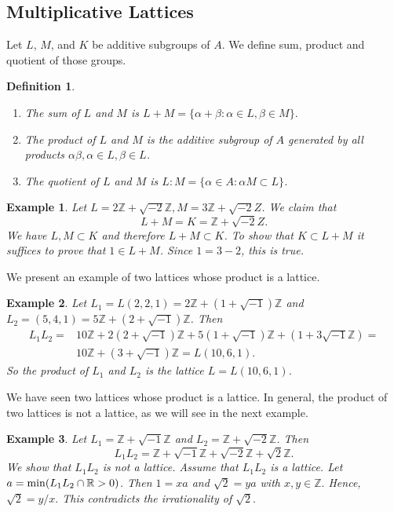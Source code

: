 \documentclass[12pt, letterpaper]{report}
\newtheorem{definition}{Definition}
\newtheorem{example}{Example}
\begin{document}
\subsection{Multiplicative Lattices}
Let $L$, $M$, and $K$ be additive subgroups of $A$. We define sum, product and quotient of those groups.
\noindent
\begin{definition}
\begin{enumerate}
\strut	
\item  The sum of $L$ and $M$ is $L+M = \{\alpha + \beta : \alpha \in L, \beta \in M \}.$
\item  The product of $L$ and $M$ is the additive subgroup of $A$ generated by all
products $\alpha\beta, \alpha \in L, \beta \in L$.
\item The quotient of $L$ and $M$ is $L : M = \{\alpha\in A : \alpha M \subset L \}$.
\end{enumerate}
\end{definition}

\begin{example}
Let $L = 2\mathbb{Z}+\sqrt{−2}\mathbb{Z}, M = 3\mathbb{Z}+ \sqrt{-2}Z$. 
We claim that 
$$
L + M = K = \mathbb{Z} + \sqrt{-2}Z.
$$
We have $L, M \subset K$ and therefore $L + M \subset K$. To show that
$K \subset L + M$ it suffices to prove that $1 \in L + M$. Since $1 = 3 - 2$, this is true.
\end{example}

We present an example of two lattices whose product is a lattice.

\begin{example}
Let $L_{1} = L(2,2,1) = 2\mathbb{Z} + (1+\sqrt{-1})\mathbb{Z}$ and
$L_{2}=(5, 4, 1) = 5\mathbb{Z} + (2 + \sqrt{-1})\mathbb{Z}$. 
Then 
$$
\begin{array}{rl}
L_{1}L_{2}  = & 10\mathbb{Z} + 2(2+\sqrt{-1})\mathbb{Z} + 5(1+\sqrt{-1})\mathbb{Z} + (1 + 3\sqrt{-1}\mathbb{Z}) =\\[2ex]
& 10\mathbb{Z} + (3 + \sqrt{-1})\mathbb{Z} = L(10,6,1).
\end{array}
$$
So the product of $L_1$ and $L_2$ is the lattice $L = L(10, 6, 1)$. 
\end{example}

We have seen two lattices whose product is a lattice. 
In general, the product of two lattices is not a lattice, as we will see in the next example.
\begin{example}
Let $L_1 = \mathbb{Z} + \sqrt{-1}\mathbb{Z}$ and $L_2 = \mathbb{Z} + \sqrt{-2}\mathbb{Z}$. 
Then
$$
L_1L_2 = \mathbb{Z} + \sqrt{-1}\mathbb{Z} + \sqrt{-2}\mathbb{Z} + \sqrt{2}\mathbb{Z}.
$$
We show that $L_1 L_2$ is not a lattice. Assume that
$L_1 L_2$ is a lattice. Let $a = {\rm min}(L_1 L_2 \cap \mathbb{R} >0 )$. 
Then $1 = xa$ and $\sqrt{2} = ya$ with $x,y \in \mathbb{Z}.$ Hence, $\sqrt{2} = y/x.$ This contradicts the irrationality of $\sqrt{2}.$
\end{example}
\end{document}
